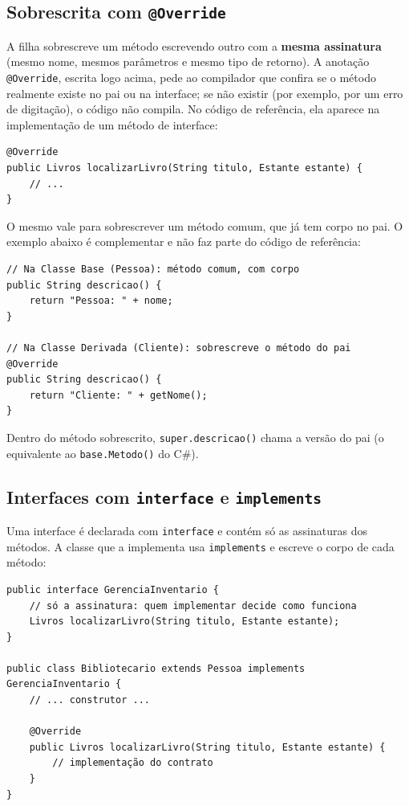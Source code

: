 \subsection{Sobrescrita com \texttt{@Override}}

A filha sobrescreve um método escrevendo outro com a \textbf{mesma assinatura} (mesmo nome, mesmos
parâmetros e mesmo tipo de retorno). A anotação \texttt{@Override}, escrita logo acima,
pede ao compilador que confira se o método realmente existe no pai ou na interface; se não
existir (por exemplo, por um erro de digitação), o código não compila. No código de
referência, ela aparece na implementação de um método de interface:

\begin{lstlisting}[style=java]
@Override
public Livros localizarLivro(String titulo, Estante estante) {
    // ...
}
\end{lstlisting}

O mesmo vale para sobrescrever um método comum, que já tem corpo no pai. O exemplo abaixo é
complementar e não faz parte do código de referência:

\begin{lstlisting}[style=java]
// Na Classe Base (Pessoa): método comum, com corpo
public String descricao() {
    return "Pessoa: " + nome;
}

// Na Classe Derivada (Cliente): sobrescreve o método do pai
@Override
public String descricao() {
    return "Cliente: " + getNome();
}
\end{lstlisting}

Dentro do método sobrescrito, \texttt{super.descricao()} chama a versão do pai (o equivalente ao
\texttt{base.Metodo()} do C\#).

\subsection{Interfaces com \texttt{interface} e \texttt{implements}}

Uma interface é declarada com \texttt{interface} e contém só as assinaturas dos métodos. A
classe que a implementa usa \texttt{implements} e escreve o corpo de cada método:

\begin{lstlisting}[style=java]
public interface GerenciaInventario {
    // só a assinatura: quem implementar decide como funciona
    Livros localizarLivro(String titulo, Estante estante);
}

public class Bibliotecario extends Pessoa implements GerenciaInventario {
    // ... construtor ...

    @Override
    public Livros localizarLivro(String titulo, Estante estante) {
        // implementação do contrato
    }
}
\end{lstlisting}

